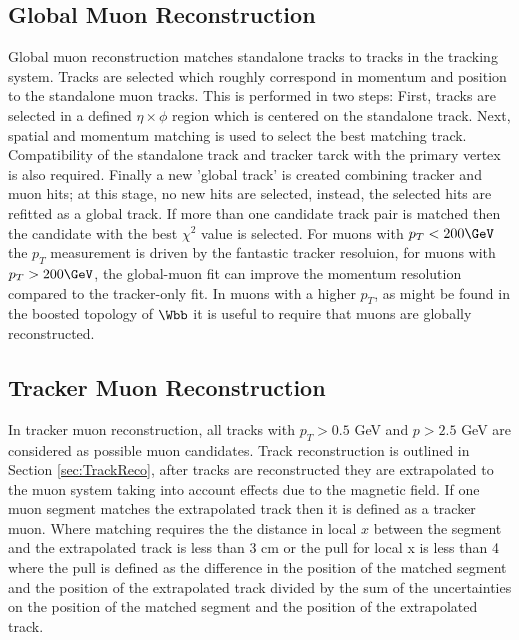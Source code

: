 \subsection{Global Muon Reconstruction}
Global muon reconstruction matches standalone tracks to tracks in the tracking
system. 
Tracks are selected which roughly correspond in momentum and position to 
the standalone muon tracks. This is performed in two steps: First,
tracks are selected in a defined $\eta\times\phi$ region which is centered
on the standalone track. Next, spatial and momentum matching is 
used to select the best matching track. Compatibility of the standalone track and tracker tarck with the
primary vertex is also required. Finally a new 'global track' is created combining
tracker and muon hits; at this stage, no new hits are selected, instead, 
the selected hits are refitted as a global track. If more than one candidate
track pair is matched then the candidate with the best $\chi^{2}$ value
is selected. 
For muons with $p_{T}<200\GeV$ the $p_{T}$ measurement is driven
by the fantastic tracker resoluion, for muons with $p_{T}>200\GeV$,
the global-muon fit can improve the momentum resolution compared
to the tracker-only fit.
In muons with a higher $p_{T}$, as might be found
in the boosted topology of $\Wbb$ it is useful to require that muons
are globally reconstructed.
\subsection{Tracker Muon Reconstruction}
In tracker muon reconstruction, all tracks with $p_{T}>0.5$ GeV
and $p>2.5$ GeV are considered as possible muon candidates. 
Track reconstruction is outlined in Section \ref{sec:TrackReco},
after tracks are reconstructed they are extrapolated to the muon
system taking into account effects due to the magnetic field.
If one muon segment matches the extrapolated track then 
it is defined as a tracker muon.  Where matching requires
the the distance in local $x$ between the segment and the extrapolated
track is less than 3 cm or the pull for local x is less than 4 where
the pull is defined as the difference in the position of the matched segment
and the position of the extrapolated track divided by the sum of 
the uncertainties on the position of the matched segment
and the position of the extrapolated track.

